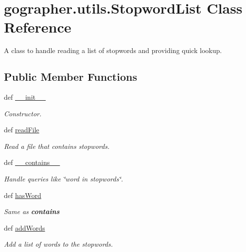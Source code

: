 \hypertarget{classgographer_1_1utils_1_1_stopword_list}{\section{gographer.\-utils.\-Stopword\-List Class Reference}
\label{classgographer_1_1utils_1_1_stopword_list}
}


A class to handle reading a list of stopwords and providing quick lookup.  


\subsection*{Public Member Functions}
\begin{DoxyCompactItemize}
\item 
def \hyperlink{classgographer_1_1utils_1_1_stopword_list_ae7cd461f1c760908acfeecbbc017e4ac}{\-\_\-\-\_\-init\-\_\-\-\_\-}
\begin{DoxyCompactList}\small\item\em Constructor. \end{DoxyCompactList}\item 
def \hyperlink{classgographer_1_1utils_1_1_stopword_list_a1cde3cc8efda8e3d6ae8f5eab2a2cd54}{read\-File}
\begin{DoxyCompactList}\small\item\em Read a file that contains stopwords. \end{DoxyCompactList}\item 
def \hyperlink{classgographer_1_1utils_1_1_stopword_list_aa15120f725f88492286d83258fab397a}{\-\_\-\-\_\-contains\-\_\-\-\_\-}
\begin{DoxyCompactList}\small\item\em Handle queries like \char`\"{}word in stopwords\char`\"{}. \end{DoxyCompactList}\item 
def \hyperlink{classgographer_1_1utils_1_1_stopword_list_a77aeee7ac52e65b8c65b3ecb1d98a6b8}{has\-Word}
\begin{DoxyCompactList}\small\item\em Same as {\bfseries contains} \end{DoxyCompactList}\item 
def \hyperlink{classgographer_1_1utils_1_1_stopword_list_a999bd225ef5c7e2635a3d48c39397ab1}{add\-Words}
\begin{DoxyCompactList}\small\item\em Add a list of words to the stopwords. \end{DoxyCompactList}\item 

\end{DoxyCompactItemize}
